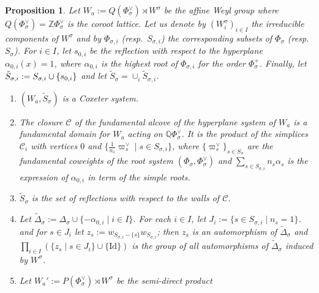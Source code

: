 \documentclass{amsart}
\newtheorem{proposition}[equation]{Proposition}
\numberwithin{equation}{section}
\theoremstyle{definition}
\theoremstyle{remark}
\newcommand\BQ{{\mathbb Q}}
\newcommand\BZ{{\mathbb Z}}
\newcommand\CC{{\mathcal C}}
\newcommand\Wa{W_a}
\newcommand\Id{\mathrm{Id}}
\begin{document}
\begin{proposition}\label{aff}
Let 
$\Wa:=Q(\Phi_\sigma^\vee)\rtimes W^\sigma$ be the affine Weyl group where
\index{Wa@$\Wa$}
$Q(\Phi_\sigma^\vee)=\BZ\Phi_\sigma^\vee$ is the coroot lattice.
Let  us denote by  $(W^\sigma_i)_{i\in I}$ the  irreducible components of
$W^\sigma$  and  by  $\Phi_{\sigma,i}$  (resp.~$S_{\sigma,i}$)  the 
corresponding subsets of
$\Phi_\sigma$ (resp.~$S_\sigma$).
For $i\in I$, let $s_{0,i}$ be the reflection with respect to the 
hyperplane $\alpha_{0,i}(x)=1$, 
where $\alpha_{0,i}$ is the highest root of $\Phi_{\sigma,i}$ for
the order $\Phi_\sigma^+$. Finally,  let $\tilde S_{\sigma,i}:=S_{\sigma,i}
\index{Stsi@$\tilde S_{\sigma,i}$}
\cup\{s_{0,i}\}$ and let $\tilde S_\sigma=
\cup_i\tilde S_{\sigma,i}$.
\begin{enumerate}
\item
$(\Wa,\tilde S_\sigma)$ is a Coxeter system.
\item 
The closure $\CC$ of the fundamental alcove 
\index{C@$\CC$}
of the hyperplane system of $\Wa$ is a
fundamental domain for $\Wa$ acting on $\BQ\Phi_\sigma^\vee$. It is the product of the 
simplices $\CC_i$ with vertices 
\index{Ci@$\CC_i$}
$0$ and $\{\frac1{n_s}\varpi_s^\vee\mid s\in S_{\sigma,i}\}$, where
$\{\varpi_s^\vee\}_{s\in S_\sigma}$ are the fundamental coweights of the 
root system $(\Phi_\sigma,\Phi_\sigma^\vee)$  and 
$\sum_{s\in S_{\sigma,i}} n_s\alpha_s$  is the
expression of $\alpha_{0,i}$ in term of the simple roots.
\item 
$\tilde S_\sigma$ is the set of
reflections with respect to the walls of $\CC$.
\item
{}
Let $\tilde\Delta_\sigma:=\Delta_\sigma\cup\{-\alpha_{0,i}\mid i\in I\}$.
For each $i\in I$, let $J_i:=\{s\in S_{\sigma,i}\mid  n_s=1\}$.
and for $s\in J_i$ let $z_s:= w_{S_{\sigma,i}-\{s\}}w_{S_{\sigma,i}}$; then $z_s$
is an automorphism of $\tilde\Delta_\sigma$ and 
$\prod_{i\in I}(\{z_s\mid s\in J_i\}\cup\{\Id\})$ is the group
of all automorphisms of $\tilde\Delta_\sigma$ induced by $W^\sigma$.
\item 
Let  $\Wa':=P(\Phi_\sigma^\vee)\rtimes W^\sigma$ be  the semi-direct product
\index{Wap@$\Wa'$}

\end{enumerate}
\end{proposition}
\end{document}
